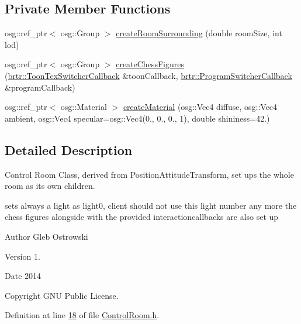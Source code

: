 \subsection*{Private Member Functions}
\begin{DoxyCompactItemize}
\item 
osg\+::ref\+\_\+ptr$<$ osg\+::\+Group $>$ \hyperlink{classbrtr_1_1_control_room_a5dfafb496e18e8e4f6d792b144dd10b9}{create\+Room\+Surrounding} (double room\+Size, int lod)
\item 
osg\+::ref\+\_\+ptr$<$ osg\+::\+Group $>$ \hyperlink{classbrtr_1_1_control_room_a15055ae530b811b7046871c5c1ef3f4f}{create\+Chess\+Figures} (\hyperlink{classbrtr_1_1_toon_tex_switcher_callback}{brtr\+::\+Toon\+Tex\+Switcher\+Callback} \&toon\+Callback, \hyperlink{classbrtr_1_1_program_switcher_callback}{brtr\+::\+Program\+Switcher\+Callback} \&program\+Callback)
\item 
osg\+::ref\+\_\+ptr$<$ osg\+::\+Material $>$ \hyperlink{classbrtr_1_1_control_room_a1cb8b6799fcb85750e0d321a4fbed6f1}{create\+Material} (osg\+::\+Vec4 diffuse, osg\+::\+Vec4 ambient, osg\+::\+Vec4 specular=osg\+::\+Vec4(0., 0., 0., 1), double shininess=42.)
\end{DoxyCompactItemize}


\subsection{Detailed Description}
Control Room Class, derived from Position\+Attitude\+Transform, set ups the whole room as its own children. 

sets always a light as light0, client should not use this light number any more the chess figures alongside with the provided interactioncallbacks are also set up \begin{DoxyAuthor}{Author}
Gleb Ostrowski 
\end{DoxyAuthor}
\begin{DoxyVersion}{Version}
1. 
\end{DoxyVersion}
\begin{DoxyDate}{Date}
2014 
\end{DoxyDate}
\begin{DoxyCopyright}{Copyright}
G\+N\+U Public License. 
\end{DoxyCopyright}


Definition at line \hyperlink{_control_room_8h_source_l00018}{18} of file \hyperlink{_control_room_8h_source}{Control\+Room.\+h}.



